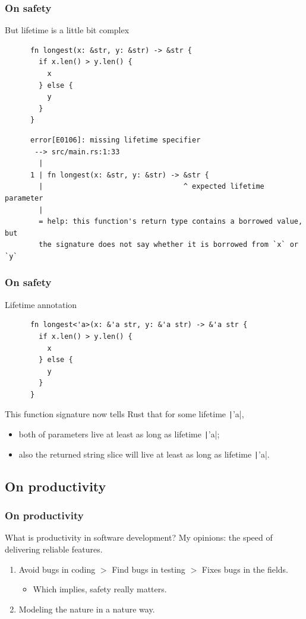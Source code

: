 \documentclass[lualatex,utf8]{beamer}
\begin{document}
\begin{frame}[fragile]
  \frametitle{On safety}
  \begin{alertblock}{But lifetime is a little bit complex}
    \begin{verbatim}
      fn longest(x: &str, y: &str) -> &str {
        if x.len() > y.len() {
          x
        } else {
          y
        }
      }
    \end{verbatim}
    \begin{verbatim}
      error[E0106]: missing lifetime specifier
       --> src/main.rs:1:33
        |
      1 | fn longest(x: &str, y: &str) -> &str {
        |                                 ^ expected lifetime parameter
        |
        = help: this function's return type contains a borrowed value, but
        the signature does not say whether it is borrowed from `x` or `y`
    \end{verbatim}
  \end{alertblock}
\end{frame}

\begin{frame}[fragile]
  \frametitle{On safety}
  \begin{exampleblock}{Lifetime annotation}
    \begin{verbatim}
      fn longest<'a>(x: &'a str, y: &'a str) -> &'a str {
        if x.len() > y.len() {
          x
        } else {
          y
        }
      }
    \end{verbatim}
    This function signature now tells Rust that for some lifetime \texttt|'a|,
    \begin{itemize}
    \item both of parameters live at least as long as lifetime \texttt|'a|;
    \item also the returned string slice will live at least as long as lifetime \texttt|'a|.
    \end{itemize}
  \end{exampleblock}
\end{frame}

\subsection{On productivity}

\begin{frame}
  \frametitle{On productivity}
  \begin{block}{What is productivity in software development?}
    My opinions: the speed of delivering reliable features.
    \begin{enumerate}
    \item Avoid bugs in coding $>$ Find bugs in testing $>$ Fixes bugs in the fields.
      \begin{itemize}
      \item Which implies, safety really matters.
      \end{itemize}
    \item Modeling the nature in a nature way.
    \end{enumerate}
  \end{block}
\end{frame}
\end{document}
